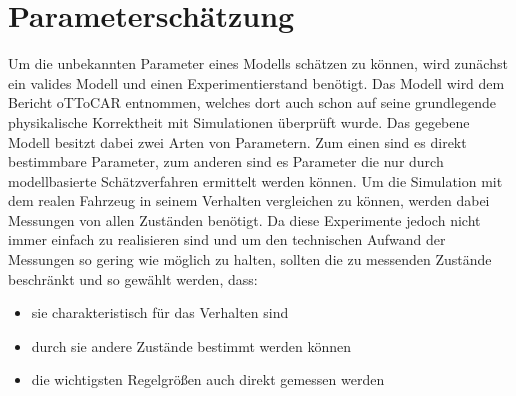 \section{Parameterschätzung}
Um die unbekannten Parameter eines Modells schätzen zu können, wird zunächst ein valides Modell und einen Experimentierstand benötigt. Das Modell wird dem Bericht oTToCAR \cite[Seite 12]{VikAnd} entnommen, welches dort auch schon auf seine grundlegende physikalische Korrektheit mit Simulationen überprüft wurde. Das gegebene Modell besitzt dabei zwei Arten von Parametern. Zum einen sind es direkt bestimmbare Parameter, zum anderen sind es Parameter die nur durch modellbasierte Schätzverfahren ermittelt werden können. Um die Simulation mit dem realen Fahrzeug in seinem Verhalten vergleichen zu können, werden dabei Messungen von allen Zuständen benötigt. Da diese Experimente jedoch nicht immer einfach zu realisieren sind und um den technischen Aufwand der Messungen so gering wie möglich zu halten, sollten die zu messenden Zustände beschränkt und so gewählt werden, dass:    
\begin{itemize}
	\item sie charakteristisch für das Verhalten sind
	\item durch sie andere Zustände bestimmt werden können
	\item die wichtigsten Regelgrößen auch direkt gemessen werden
\end{itemize}
